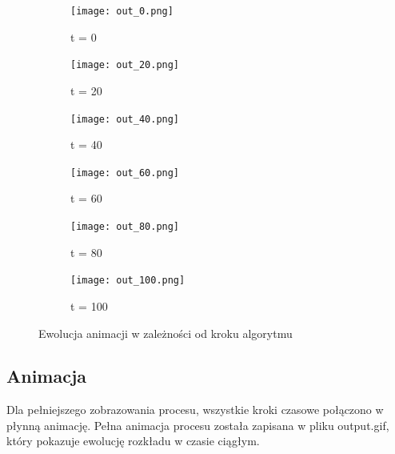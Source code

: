 \documentclass{article}
\begin{document}
\begin{figure}[H]
    \centering
    \begin{subfigure}[b]{0.3\textwidth}
        \texttt{[image: out\_0.png]}
        \caption{t = 0}
    \end{subfigure}
    \begin{subfigure}[b]{0.3\textwidth}
        \texttt{[image: out\_20.png]}
        \caption{t = 20}
    \end{subfigure}
    \begin{subfigure}[b]{0.3\textwidth}
        \texttt{[image: out\_40.png]}
        \caption{t = 40}
    \end{subfigure}
    \begin{subfigure}[b]{0.3\textwidth}
        \texttt{[image: out\_60.png]}
        \caption{t = 60}
    \end{subfigure}
    \begin{subfigure}[b]{0.3\textwidth}
        \texttt{[image: out\_80.png]}
        \caption{t = 80}
    \end{subfigure}
    \begin{subfigure}[b]{0.3\textwidth}
        \texttt{[image: out\_100.png]}
        \caption{t = 100}
    \end{subfigure}
    \caption{Ewolucja animacji w zależności od kroku algorytmu}
    \label{fig:temperature-evolution}
\end{figure}

\subsection{Animacja}
Dla pełniejszego zobrazowania procesu, wszystkie kroki czasowe połączono w płynną animację. Pełna animacja procesu została zapisana w pliku output.gif, który pokazuje ewolucję rozkładu w czasie ciągłym.
\end{document}
